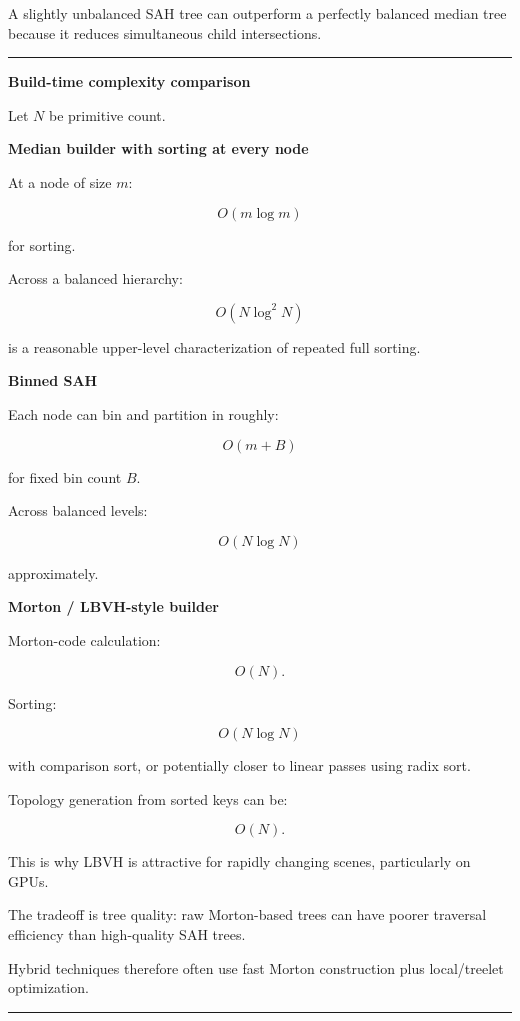 A slightly unbalanced SAH tree can outperform a perfectly balanced median tree because it reduces simultaneous child intersections.

\begin{center}\rule{0.5\linewidth}{0.5pt}\end{center}

\textbf{Build-time complexity comparison}

Let \(N\) be primitive count.

\textbf{Median builder with sorting at every node}

At a node of size \(m\):

\[
O(m\log m)
\]

for sorting.

Across a balanced hierarchy:

\[
O(N\log^2N)
\]

is a reasonable upper-level characterization of repeated full sorting.

\textbf{Binned SAH}

Each node can bin and partition in roughly:

\[
O(m+B)
\]

for fixed bin count \(B\).

Across balanced levels:

\[
O(N\log N)
\]

approximately.

\textbf{Morton / LBVH-style builder}

Morton-code calculation:

\[
O(N).
\]

Sorting:

\[
O(N\log N)
\]

with comparison sort, or potentially closer to linear passes using radix sort.

Topology generation from sorted keys can be:

\[
O(N).
\]

This is why LBVH is attractive for rapidly changing scenes, particularly on GPUs.

The tradeoff is tree quality: raw Morton-based trees can have poorer traversal efficiency than high-quality SAH trees.

Hybrid techniques therefore often use fast Morton construction plus local/treelet optimization.

\begin{center}\rule{0.5\linewidth}{0.5pt}\end{center}

